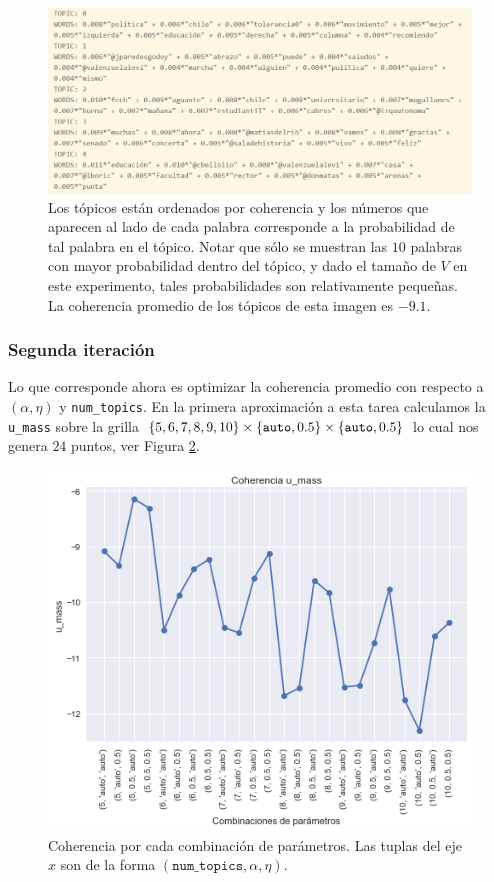 \documentclass{article}
\begin{document}
	\begin{figure}[H]
		\centering
		\includegraphics[scale=.4]{../imgs/boric0_informe.png}
		\caption{Los tópicos están ordenados por coherencia y los números que aparecen al lado de cada palabra corresponde a la probabilidad de tal palabra en el tópico. Notar que sólo se muestran las $10$ palabras con mayor probabilidad dentro del tópico, y dado el tamaño de $V$ en este experimento, tales probabilidades son relativamente pequeñas. La coherencia promedio de los tópicos de esta imagen es $-9.1$.}
		\label{fig: boric0_informe}
	\end{figure}

	\subsubsection{Segunda iteración}
	Lo que corresponde ahora es optimizar la coherencia promedio con respecto a $(\alpha, \eta)$ y \texttt{num\_topics}. En la primera aproximación a esta tarea calculamos la \texttt{u\_mass} sobre la grilla $\left\{5,6,7,8,9,10\right\}\times\left\{\texttt{auto}, 0.5\right\}\times\left\{\texttt{auto}, 0.5\right\}$ lo cual nos genera $24$ puntos, ver Figura \ref{fig: param_optimization0_informe}.
	
	 \begin{figure}[H]
	 	\centering
	 	\includegraphics[scale=.4]{../imgs/param_optimization0_informe.png}
	 	\caption{Coherencia por cada combinación de parámetros. Las tuplas del eje $x$ son de la forma $(\texttt{num\_topics}, \alpha, \eta)$.}
	 	\label{fig: param_optimization0_informe}
	 \end{figure}
 	
\end{document}

